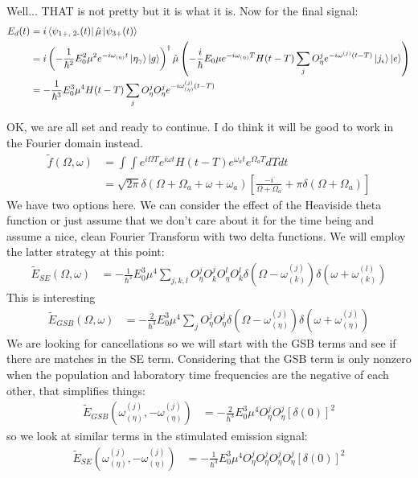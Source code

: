 Well... THAT is not pretty but it is what it is.  Now for the final signal:
\begin{align}
	E_d (t)&=  i \bra{\psi_{\text{1+, 2-}} (t)} \hat{\mu} \ket{\psi_{\text{3+}} (t)} \\
	&=  i \left( -\frac{1}{\hbar^2} E^2_0 \mu^2 e^{-i \omega_{(\eta)}t}  \ket{\eta_{\gamma}} \ket{g}  \right)^{\dagger} \hat{\mu} \left(  -\frac{i}{\hbar} E_0 \mu  e^{-i \omega_{(\eta)}T} H(t-T) \sum_{j}  O_{\eta}^{j}  e^{-i \omega^{(j)} (t - T) } \ket{j_{\epsilon}} \ket{e} \right) \\
	&=  -\frac{1}{\hbar^3} E^3_0 \mu^4  H(t-T) \sum_{j}  O_{\eta}^{j} O_{\eta}^{j}  e^{-i \omega^{(j)}_{(\eta)} (t - T) }
\end{align}

OK, we are all set and ready to continue.  I do think it will be good to work in the Fourier domain instead.
\begin{align}
	\tilde{f} (\Omega, \omega)  &= \int \int e^{i \Omega T} e^{i \omega t} H(t-T) e^{\omega_a t} e^{\Omega_a T} dT dt  \\
	 &=\sqrt{2 \pi} \delta \left(  \Omega + \Omega_a + \omega + \omega_a \right)  \left[\frac{-i}{\Omega + \Omega_a}  + \pi \delta \left(  \Omega + \Omega_a \right) \right]
\end{align}
We have two options here.  We can consider the effect of the Heaviside theta function or just assume that we don't care about it for the time being and assume a nice, clean Fourier Transform with two delta functions.  We will employ the latter strategy at this point:
\begin{align}
	\tilde{E}_{SE}(\Omega, \omega)  &=  -\frac{1}{\hbar^3} E^3_0 \mu^4 \sum_{j,k,l}O_{\eta}^{j} O_{k}^{j} O_{\eta}^{l} O_{k}^{l}  \delta \left( \Omega -   \omega^{(j)}_{(k)}\right)  \delta \left( \omega + \omega^{(l)}_{(k)}  \right)
\end{align}
This is interesting
\begin{align}
	\tilde{E}_{GSB} (\Omega, \omega)  &=  -\frac{2}{\hbar^3} E^3_0 \mu^4  \sum_{j}  O_{\eta}^{j} O_{\eta}^{j}   \delta \left( \Omega -  \omega^{(j)}_{(\eta)} \right)  \delta \left( \omega +  \omega^{(j)}_{(\eta)} \right)
\end{align}
We are looking for cancellations so we will start with the GSB terms and see if there are matches in the SE term.  Considering that the GSB term is only nonzero when the population and laboratory time frequencies are the negative of each other, that simplifies things:
\begin{align}
	\tilde{E}_{GSB} \left( \omega^{(j)}_{(\eta)}, -\omega^{(j)}_{(\eta)}\right)  &=  -\frac{2}{\hbar^3} E^3_0 \mu^4  O_{\eta}^{j} O_{\eta}^{j}  \left[ \delta(0) \right]^2
\end{align}
so we look at similar terms in the stimulated emission signal:
\begin{align}
	\tilde{E}_{SE}\left( \omega^{(j)}_{(\eta)}, -\omega^{(j)}_{(\eta)}\right)    &=  -\frac{1}{\hbar^3} E^3_0 \mu^4  O_{\eta}^{j} O_{\eta}^{j} O_{\eta}^{j} O_{\eta}^{j}  \left[ \delta(0) \right]^2
\end{align}

